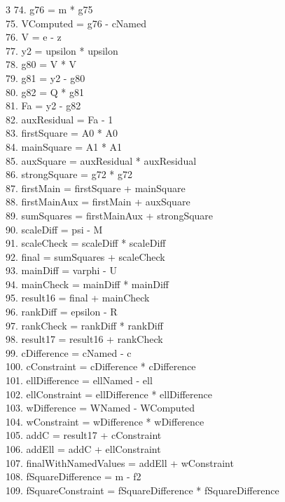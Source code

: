 \documentclass[10pt]{article}
\begin{document}
\begin{multicols}{3}
74. g76 = m * g75\\
75. VComputed = g76 - cNamed\\
76. V = e - z\\
77. y2 = upsilon * upsilon\\
78. g80 = V * V\\
79. g81 = y2 - g80\\
80. g82 = Q * g81\\
81. Fa = y2 - g82\\
82. auxResidual = Fa - 1\\
83. firstSquare = A0 * A0\\
84. mainSquare = A1 * A1\\
85. auxSquare = auxResidual * auxResidual\\
86. strongSquare = g72 * g72\\
87. firstMain = firstSquare + mainSquare\\
88. firstMainAux = firstMain + auxSquare\\
89. sumSquares = firstMainAux + strongSquare\\
90. scaleDiff = psi - M\\
91. scaleCheck = scaleDiff * scaleDiff\\
92. final = sumSquares + scaleCheck\\
93. mainDiff = varphi - U\\
94. mainCheck = mainDiff * mainDiff\\
95. result16 = final + mainCheck\\
96. rankDiff = epsilon - R\\
97. rankCheck = rankDiff * rankDiff\\
98. result17 = result16 + rankCheck\\
99. cDifference = cNamed - c\\
100. cConstraint = cDifference * cDifference\\
101. ellDifference = ellNamed - ell\\
102. ellConstraint = ellDifference * ellDifference\\
103. wDifference = WNamed - WComputed\\
104. wConstraint = wDifference * wDifference\\
105. addC = result17 + cConstraint\\
106. addEll = addC + ellConstraint\\
107. finalWithNamedValues = addEll + wConstraint\\
108. fSquareDifference = m - f2\\
109. fSquareConstraint = fSquareDifference * fSquareDifference\\

\end{multicols}
\end{document}
